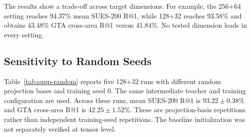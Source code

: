 The results show a trade-off across target dimensions. For example, the 256+64 setting reaches 94.37\% mean SUES-200 R@1, while 128+32 reaches 93.58\% and obtains 43.48\% GTA cross-area R@1 versus 41.84\%. No tested dimension leads in every setting.

\subsection{Sensitivity to Random Seeds}
Table~\ref{tab:supp-random} reports five 128+32 runs with different random projection bases and training seed 0. The same intermediate teacher and training configuration are used. Across these runs, mean SUES-200 R@1 is $93.22\pm0.38\%$ and GTA cross-area R@1 is $42.25\pm1.52\%$. These are projection-basis repetitions rather than independent training-seed repetitions. The baseline initialization was not separately verified at tensor level.

\par\medskip\noindent\begin{minipage}{\columnwidth}
\captionsetup{type=table}
\centering
\caption{128+32 student with five random projection bases and training seed 0. Cells report D$\rightarrow$S R@1/AP (\%).}
\label{tab:supp-random}
{\footnotesize\setlength{\tabcolsep}{2pt}\renewcommand{\arraystretch}{1.08}
}
\end{minipage}\par\medskip

